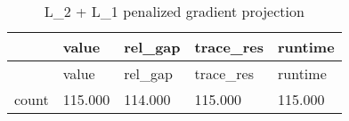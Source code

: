 \documentclass[
  10pt,
  a4paper,
,tablecaptionabove
]{scrartcl}
\begin{document}
\begin{longtable}[]{@{}lllll@{}}
\caption{L\_2 + L\_1 penalized gradient projection}\tabularnewline
\toprule
\begin{minipage}[b]{0.11\columnwidth}\raggedright
\strut
\end{minipage} & \begin{minipage}[b]{0.20\columnwidth}\raggedright
value\strut
\end{minipage} & \begin{minipage}[b]{0.13\columnwidth}\raggedright
rel\_gap\strut
\end{minipage} & \begin{minipage}[b]{0.15\columnwidth}\raggedright
trace\_res\strut
\end{minipage} & \begin{minipage}[b]{0.15\columnwidth}\raggedright
runtime\strut
\end{minipage}\tabularnewline
\midrule
\endfirsthead
\toprule
\begin{minipage}[b]{0.11\columnwidth}\raggedright
\strut
\end{minipage} & \begin{minipage}[b]{0.20\columnwidth}\raggedright
value\strut
\end{minipage} & \begin{minipage}[b]{0.13\columnwidth}\raggedright
rel\_gap\strut
\end{minipage} & \begin{minipage}[b]{0.15\columnwidth}\raggedright
trace\_res\strut
\end{minipage} & \begin{minipage}[b]{0.15\columnwidth}\raggedright
runtime\strut
\end{minipage}\tabularnewline
\midrule
\endhead
\begin{minipage}[t]{0.11\columnwidth}\raggedright
count\strut
\end{minipage} & \begin{minipage}[t]{0.20\columnwidth}\raggedright
115.000\strut
\end{minipage} & \begin{minipage}[t]{0.13\columnwidth}\raggedright
114.000\strut
\end{minipage} & \begin{minipage}[t]{0.15\columnwidth}\raggedright
115.000\strut
\end{minipage} & \begin{minipage}[t]{0.15\columnwidth}\raggedright
115.000\strut
\end{minipage}\tabularnewline

\end{longtable}
\end{document}
